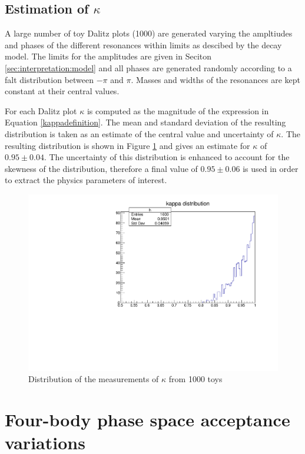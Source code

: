\subsection{Estimation of $\kappa$}

A large number of toy Dalitz plots (1000) are generated varying the ampltiudes and phases of the different resonances within limits as descibed by the decay model. The limits for the amplitudes are given in Seciton \ref{sec:interpretation:model} and all phases are generated randomly according to a falt distribution between $-\pi$ and $\pi$. Masses and widths of the resonances are kept constant at their central values. 

For each Dalitz plot $\kappa$ is computed as the magnitude of the expression in Equation \ref{kappadefinition}. The mean and standard deviation of the resulting distribution is taken as an estimate of the central value and uncertainty of $\kappa$. The resulting distribution is shown in Figure \ref{kappadistribution} and gives an estimate for $\kappa$ of $0.95 \pm 0.04$. The uncertainty of this distribution is enhanced to account for the skewness of the distribution, therefore a final value of $0.95 \pm 0.06$ is used in order to extract the physics parameters of interest.

\begin{figure}[h]
\centering
\includegraphics[width=0.5\linewidth]{figures/results/kappa.pdf}
\caption{Distribution of the measurements of $\kappa$ from 1000 toys}
\label{kappadistribution}
\end{figure}

\section{Four-body phase space acceptance variations}
\label{sec:interpretation:inputs}

